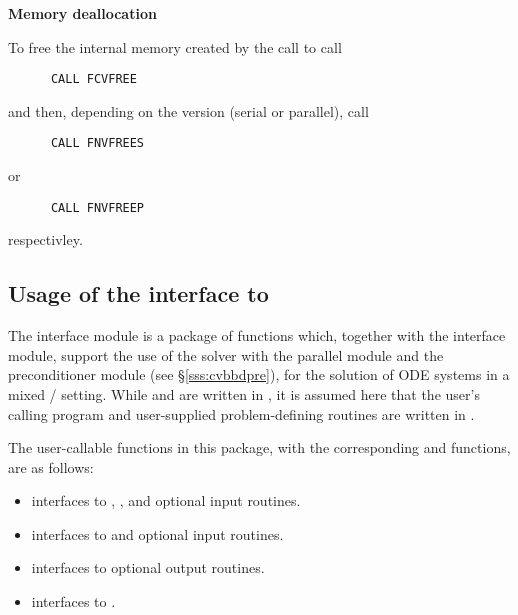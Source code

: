 \begin{Steps}
\item {\bf Memory deallocation}

  To free the internal memory created by the call to  call
\begin{verbatim}
      CALL FCVFREE
\end{verbatim}
  and then, depending on the {\nvector} version (serial or parallel), call
\begin{verbatim}
      CALL FNVFREES
\end{verbatim}
  or
\begin{verbatim}
      CALL FNVFREEP  
\end{verbatim}
  respectivley.

\end{Steps}

\subsection{Usage of the {\fcvbbd} interface to {\cvbbdpre}}

The {\fcvbbd} interface module is a package of {\C} functions which,
together with the {\fcvode} interface module, support the use of the
{\cvode} solver with the parallel {\nvecp} module and the {\cvbbdpre} 
preconditioner module (see \S\ref{sss:cvbbdpre}), for the solution of 
ODE systems in a mixed {\F}/{\C} setting.  
While {\cvode} and {\cvbbdpre} are written in {\C}, it is
assumed here that the user's calling program and user-supplied
problem-defining routines are written in {\F}.

The user-callable functions in this package, with the corresponding
{\cvode} and {\cvbbdpre} functions, are as follows: 
\begin{itemize}
\item {}
  interfaces to , ,
  and {\spgmr} optional input routines.
\item {}
  interfaces to  and {\spgmr} optional input routines.
\item {}
  interfaces to {\cvbbdpre} optional output routines.
\item {}
  interfaces to .
\end{itemize}

